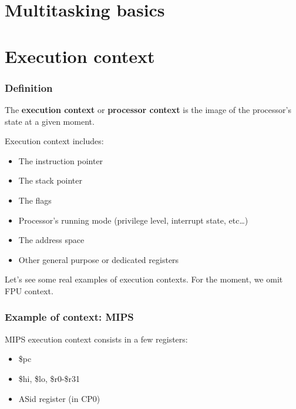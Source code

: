%
%

\section{Multitasking basics}


%
%

\section{Execution context}


\begin{frame}
  \frametitle{Definition}

  The \textbf{execution context} or \textbf{processor context} is the
  image of the processor's state at a given moment.

  Execution context includes:

  \begin{itemize}
  \item
    The instruction pointer
  \item
    The stack pointer
  \item
    The flags
  \item
    Processor's running mode (privilege level, interrupt state,
    etc\ldots)
  \item
    The address space
  \item
    Other general purpose or dedicated registers
  \end{itemize}

  \-

  Let's see some real examples of execution contexts. For the moment,
  we omit FPU context.

\end{frame}


\begin{frame}
  \frametitle{Example of context: MIPS}

  MIPS execution context consists in a few registers:

  \begin{itemize}
  \item
    \$pc
  \item
    \$hi, \$lo, \$r0-\$r31
  \item
    ASid register (in CP0)
  \end{itemize}

\end{frame}

